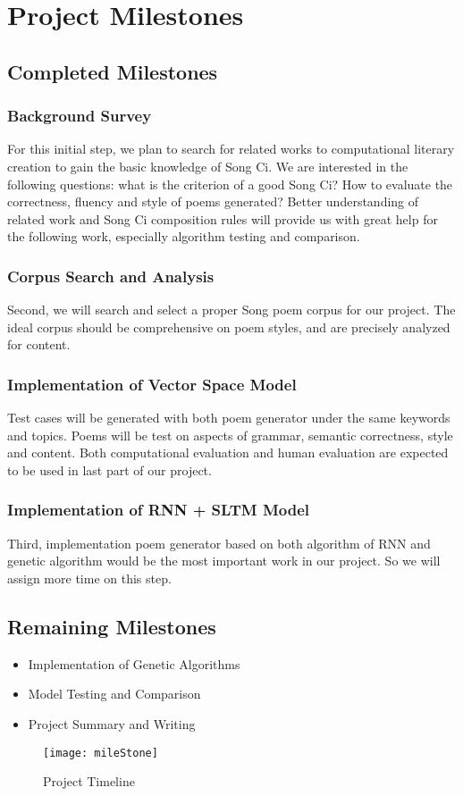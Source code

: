\section{Project Milestones} 

\subsection{Completed Milestones} 
%
\subsubsection{Background Survey}
 For this initial step, we plan to search for related works to computational literary creation to gain the basic knowledge of Song Ci.
%
We are interested in the following questions: what is the criterion of a good Song Ci? How to evaluate the correctness, fluency and style of poems generated?
%
Better understanding of related work and Song Ci composition rules will provide us with great help for the following work, especially algorithm testing and comparison. 
%
\subsubsection {Corpus Search and Analysis}
%
Second, we will search and select a proper Song poem corpus for our project. The ideal corpus should be comprehensive on poem styles, and are precisely analyzed for content. 
%
\subsubsection{ Implementation of Vector Space Model }
Test cases will be generated with both poem generator under the same keywords and topics. Poems will be test on aspects of grammar, semantic correctness, style and content. Both computational evaluation and human evaluation are expected to be used in last part of our project.
\subsubsection{ Implementation of RNN + SLTM Model  }   
Third, implementation poem generator based on both algorithm of RNN and genetic algorithm would be the most important work in our project. So we will assign more time on this step. 
%

\subsection{Remaining Milestones}


\begin{itemize}
\item Implementation of Genetic Algorithms 
\item Model Testing and Comparison
\item Project Summary and Writing
\end{itemize}

\begin{figure}[htbp]
	\centering
	\texttt{[image: mileStone]}
	\caption{Project Timeline}
	\label{fig:projecttimeline}	
\end{figure} 